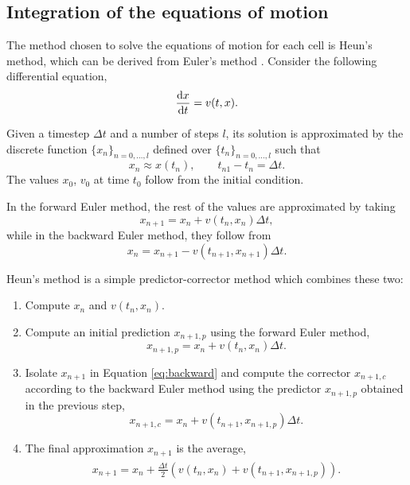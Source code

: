 \subsection{Integration of the equations of motion}

The method chosen to solve the equations of motion for each cell is Heun's method, which can be derived from Euler's method \parencite{Suli_2003,Brorson_2022}. Consider the following differential equation,
$$\frac{\mathrm{d} x}{\mathrm{d} t} = v(t,x).$$

Given a timestep $\Delta t$ and a number of steps $l$, its solution is approximated by the discrete function $\{x_n\}_{n=0,\dots,l}$ defined over $\{t_n\}_{n=0,\dots,l}$ such that
$$x_n\approx x(t_n), \quad\quad t_{n1}-t_n=\Delta t.$$
The values $x_0$, $v_0$ at time $t_0$ follow from the initial condition.

In the forward Euler method, the rest of the values are approximated by taking
\begin{equation}
    x_{n+1}=x_n+ v(t_n,x_n)\Delta t,
\end{equation}
while in the backward Euler method, they follow from
\begin{equation}\label{eq:backward}
    x_n=x_{n+1}-v(t_{n+1},x_{n+1})\Delta t.
\end{equation}

Heun's method is a simple predictor-corrector method which combines these two:

\begin{enumerate}
    \item Compute $x_n$ and $v(t_n,x_n)$.
    \item Compute an initial prediction $x_{n+1,p}$ using the forward Euler method,
        $$x_{n+1,p}=x_n+ v(t_n,x_n)\Delta t.$$
    \item Isolate $x_{n+1}$ in Equation \ref{eq:backward} and compute the corrector $x_{n+1,c}$ according to the backward Euler method using the predictor $x_{n+1,p}$ obtained in the previous step,
        $$x_{n+1,c}= x_n +v(t_{n+1},x_{n+1,p})\Delta t.$$
    \item The final approximation $x_{n+1}$ is the average,
        \begin{align}
            \begin{aligned}
                x_{n+1} = x_n + \frac{\Delta t}{2} \left(v(t_n,x_n)+v(t_{n+1},x_{n+1,p})\right).
            \end{aligned}
        \end{align}
\end{enumerate}


